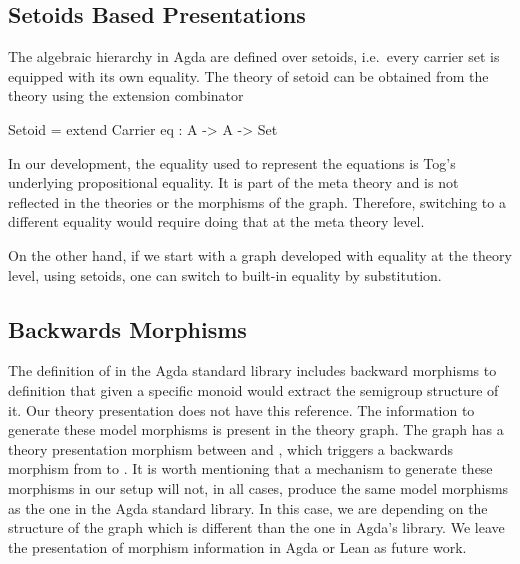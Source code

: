 \subsection{Setoids Based Presentations}
\label{subsec:setoid-based-pres}
The algebraic hierarchy in Agda are defined over setoids, i.e.~every carrier set is equipped with its own equality. 
The theory of setoid can be obtained from the  theory using the extension combinator 
\begin{togcode}
Setoid = extend Carrier {eq : A -> A -> Set}
\end{togcode}
In our development, the equality used to represent the equations is Tog's underlying propositional equality. It is part of the meta theory and is not reflected in the theories or the morphisms of the graph. Therefore, switching to a different equality would require doing that at the meta theory level. 

On the other hand, if we start with a graph developed with equality at the theory level, using setoids, one can switch to built-in equality by substitution. 





\subsection{Backwards Morphisms} 
\label{subsec:model-morph}
\label{subsec:agda:modelMorphisms}
The definition of  in the Agda standard library includes backward morphisms to   definition that given a specific monoid would extract the semigroup structure of it. Our theory presentation does not have this reference. The information to generate these model morphisms is present in the theory graph. The graph has a theory presentation morphism between  and , which triggers a backwards morphism from  to . It is worth mentioning that a mechanism to generate these morphisms in our setup will not, in all cases, produce the same model morphisms as the one in the Agda standard library. In this case, we are depending on the structure of the graph which is different than the one in Agda's library. We leave the presentation of morphism information in Agda or Lean as future work. 

